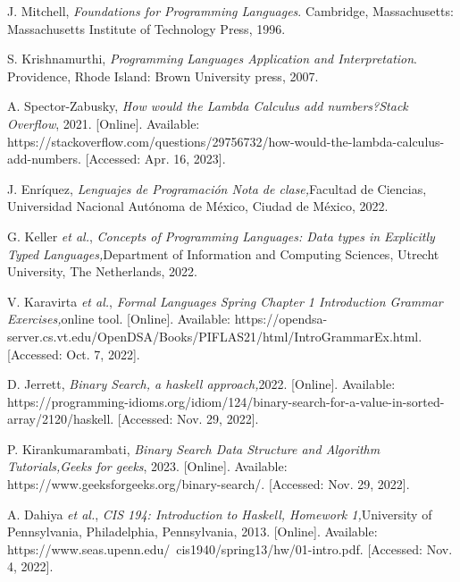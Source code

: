 \begin{thebibliography}{11}
    
    \label{sec:9}
    \hypertarget{9}{}
    J. Mitchell, \textit{Foundations for Programming Languages}. Cambridge, Massachusetts: Massachusetts Institute of Technology Press, 1996.
    
    
    \label{sec:10}
    \hypertarget{10}{}
    S. Krishnamurthi, \textit{Programming Languages Application and Interpretation}. Providence, Rhode Island: Brown University press, 2007.

    
    \label{sec:11}
    \hypertarget{11}{}
    A. Spector-Zabusky, \textit{How would the Lambda Calculus add numbers?}\textit{Stack Overflow}, 2021. [Online]. Available: https://stackoverflow.com/questions/29756732/how-would-the-lambda-calculus-add-numbers. [Accessed: Apr. 16, 2023].


    \label{sec:12}
    \hypertarget{12}{}
    J. Enríquez, \textit{Lenguajes de Programación Nota de clase,}Facultad de Ciencias, Universidad Nacional Autónoma de México, Ciudad de México, 2022.

    
    \label{sec:13}
    \hypertarget{13}{}
    G. Keller \textit{et al.}, \textit{Concepts of Programming Languages: Data types in Explicitly Typed Languages,}Department of Information and Computing Sciences, Utrecht University, The Netherlands, 2022.


    \label{sec:14}
    \hypertarget{14}{}
    V. Karavirta \textit{et al.}, \textit{Formal Languages Spring Chapter 1 Introduction Grammar Exercises,}online tool. [Online]. Available: https://opendsa-server.cs.vt.edu/OpenDSA/Books/PIFLAS21/html/IntroGrammarEx.html. [Accessed: Oct. 7, 2022].

    \label{sec:15}
    \hypertarget{15}{}
    D. Jerrett, \textit{Binary Search, a haskell approach,}2022. [Online]. Available: https://programming-idioms.org/idiom/124/binary-search-for-a-value-in-sorted-array/2120/haskell. [Accessed: Nov. 29, 2022].

    \label{sec:16}
    \hypertarget{16}{}
    P. Kirankumarambati, \textit{Binary Search Data Structure and Algorithm Tutorials,}\textit{Geeks for geeks}, 2023. [Online]. Available: https://www.geeksforgeeks.org/binary-search/. [Accessed: Nov. 29, 2022].

    \label{sec:17}
    \hypertarget{17}{}
    A. Dahiya \textit{et al.}, \textit{CIS 194: Introduction to Haskell, Homework 1,}University of Pennsylvania, Philadelphia, Pennsylvania, 2013. [Online]. Available: https://www.seas.upenn.edu/~cis1940/spring13/hw/01-intro.pdf. [Accessed: Nov. 4, 2022].


\end{thebibliography}
